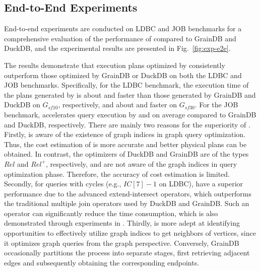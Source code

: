 \subsection{End-to-End Experiments}
\label{sec:experiment-e2e}

End-to-end experiments are conducted on LDBC and JOB benchmarks for a comprehensive evaluation of the performance of \name compared to GrainDB and DuckDB,
and the experimental results are presented in Fig.~\ref{fig:exp-e2e}.

The results demonstrate that execution plans optimized by \name consistently outperform those optimized by GrainDB or DuckDB on both the LDBC and JOB benchmarks.
Specifically, for the LDBC benchmark, the execution time of the plans generated by \name is about  and  faster than those generated by GrainDB and DuckDB on $G_{sf10}$, respectively,
and about  and  faster on $G_{sf30}$.
For the JOB benchmark, \name accelerates query execution by  and  on average compared to GrainDB and DuckDB, respectively.
There are mainly two reasons for the superiority of \name.
Firstly, \name is aware of the existence of graph indices in graph query optimization.
Thus, the cost estimation of \name is more accurate and better physical plans can be obtained.
In contrast, the optimizers of DuckDB and GrainDB are of the types $Rel$ and $Rel^+$, respectively, and are not aware of the graph indices in query optimization phase.
Therefore, the accuracy of cost estimation is limited.
Secondly, for queries with cycles (e.g., $IC[7]-1$ on LDBC), \name have a superior performance due to the advanced extend-intersect operators, which outperforms the traditional multiple join operators used by DuckDB and GrainDB.
Such an operator can significantly reduce the time consumption, which is also demonstrated through experiments in .
 Thirdly, \name is more adept at identifying opportunities to effectively utilize graph indices to get neighbors of vertices, since it optimizes graph queries from the graph perspective.
Conversely, GrainDB occasionally partitions the process into separate stages, first retrieving adjacent edges and subsequently obtaining the corresponding endpoints. 